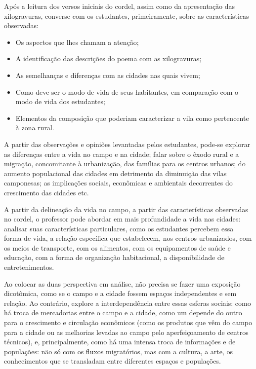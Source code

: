 \documentclass[11pt]{extarticle}
\begin{document}
Após a leitura dos versos iniciais do cordel, assim como da apresentação das xilogravuras, converse com os estudantes, primeiramente, sobre as características observadas:

\begin{itemize}
\item Os aspectos que lhes chamam a atenção;

\item A identificação das descrições do poema com as xilogravuras;

\item As semelhanças e diferenças com as cidades nas quais vivem;

\item Como deve ser o modo de vida de seus habitantes, em comparação com o modo de vida dos estudantes;

\item Elementos da composição que poderiam caracterizar a vila como pertencente à zona rural.

\end{itemize}

A partir das observações e opiniões levantadas pelos estudantes, pode-se explorar as diferenças entre a vida no campo e na cidade; falar sobre o êxodo rural e a migração, concomitante à urbanização, das famílias para os centros urbanos; do aumento populacional das cidades em detrimento da diminuição das vilas camponesas; as implicações sociais, econômicas e ambientais decorrentes do crescimento das cidades etc.

A partir da delineação da vida no campo, a partir das características observadas no cordel, o professor pode abordar em mais profundidade a vida nas cidades: analisar suas características particulares, como os estudantes percebem essa forma de vida, a relação específica que estabelecem, nos centros urbanizados, com os meios de transporte, com os alimentos, com os equipamentos de saúde e educação, com a forma de organização habitacional, a disponibilidade de entretenimentos.

Ao colocar as duas perspectiva em análise, não precisa se fazer uma exposição dicotômica, como se o campo e a cidade fossem espaços independentes e sem relação. Ao contrário, explore a interdependência entre essas esferas sociais: como há troca de mercadorias entre o campo e a cidade, como um depende do outro para o crescimento e circulação econômicos (como os produtos que vêm do campo para a cidade ou as melhorias levadas ao campo pelo aperfeiçoamento de centros técnicos), e, principalmente, como há uma intensa troca de informações e de populações: não só com os fluxos migratórios, mas com a cultura, a arte, os conhecimentos que se transladam entre diferentes espaços e populações.
\end{document}
